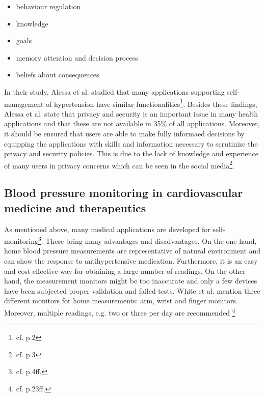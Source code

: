 \begin{itemize}
\setlength\itemsep{-0.5em}
  \item behaviour regulation
  \item knowledge 
  \item goals
  \item memory attention and decision process
  \item beliefs about consequences
\end{itemize}

In their study, Alessa et al. studied that many applications supporting self-management of hypertension have similar functionalities\footnote{cf.\autocite{alessa} p.2}.
Besides these findings, Alessa et al. state that privacy and security is an important issue in many health applications and that these are not available in 35\% of all applications. Moreover, it should be ensured that users are able to make fully informaed decisions by equipping the applications with skills and information necessary to scrutinize the privacy and security policies. This is due to the lack of knowledge and experience of many users in privacy concerns which can be seen in the social media\footnote{cf.\autocite{alessa} p.3}.

\subsection{Blood pressure monitoring in cardiovascular medicine and therapeutics}
As mentioned above, many medical applications are developed for self-monitoring\footnote{cf. p.4ff.\autocite{white_blood_2007}}. These bring many advantages and disadvantages. On the one hand, home blood pressure measurements are representative of natural environment and can show the response to antihypertensive medication. Furthermore, it is an easy and cost-effective way for obtaining a large number of readings. 
On the other hand, the measurement monitors might be too inaccurate and only a few devices have been subjected proper validation and failed tests.
White et al. mention three different monitors for home measurements: arm, wrist and finger monitors. Moreover, multiple readings, e.g. two or three per day are recommended \footnote{cf. p.23ff.\autocite{white_blood_2007}}

